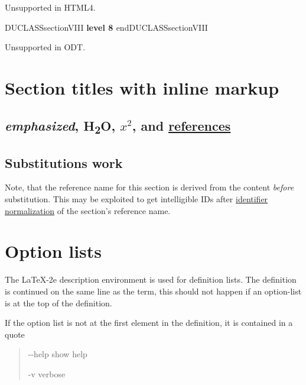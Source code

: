 \documentclass[a4paper]{article}
\newenvironment{DUclass}[1]%
  {%
   \def\DocutilsClassFunctionName{DUCLASS#1}
     \csname \DocutilsClassFunctionName \endcsname}%
  {\csname end\DocutilsClassFunctionName \endcsname}%
\providecommand*{\DUoptionlistlabel}[1]{\bfseries #1 \hfill}
\newenvironment{DUoptionlist}{%
    \list{}{\setlength{\labelwidth}{\DUoptionlistindent}
            \setlength{\rightmargin}{1cm}
            \setlength{\leftmargin}{\rightmargin}
            \addtolength{\leftmargin}{\labelwidth}
            \addtolength{\leftmargin}{\labelsep}
            \renewcommand{\makelabel}{\DUoptionlistlabel}}
  }
  {\endlist}
\providecommand*{\DUtitle}[1]{%
  \smallskip\noindent\textbf{#1}\smallskip}
\begin{document}
Unsupported in HTML4.


\begin{DUclass}{sectionVIII}
\DUtitle{level 8%
  \label{level-8}%
}
\end{DUclass}

Unsupported in ODT.


\section{Section titles with inline markup%
  \label{section-titles-with-inline-markup}%
  \label{references}%
}


\subsection{\emph{emphasized}, H\textsubscript{2}O, $x^2$, and \hyperref[references]{references}%
  \label{emphasized-h2o-x-2-and-references}%
}


\subsection{Substitutions work%
  \label{substitutions-fail}%
}

Note, that the \textquotedbl{}reference name\textquotedbl{} for this section is derived from the
content \emph{before} substitution. This may be exploited to get intelligible
IDs after \href{https://docutils.sourceforge.io/docs/ref/rst/directives.html\#identifier-normalization}{identifier normalization} of the section's reference name.



\section{Option lists%
  \label{option-lists}%
}

The LaTeX-2e description environment is used for definition lists.
The definition is continued on the same line as the term, this should
not happen if an option-list is at the top of the definition.

If the option list is not at the first element in the definition, it
is contained in a quote

\begin{quote}
\begin{DUoptionlist}
\item[-{}-help]  show help

\item[-v]  verbose
\end{DUoptionlist}
\end{quote}
\end{document}
